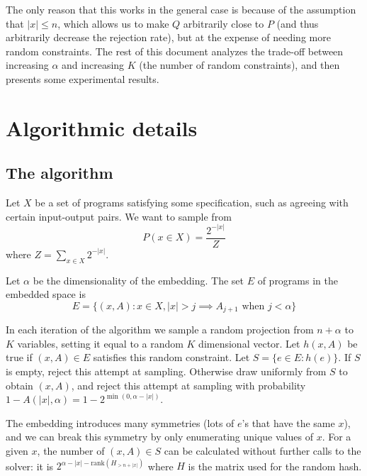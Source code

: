 \documentclass{article}
\begin{document}
The only reason that this works in the general case is because of the assumption that $|x|\leq n$,
which allows us to make $Q$ arbitrarily close to $P$ (and thus arbitrarily decrease the rejection rate),
but at the expense of needing more random constraints.
The rest of this document analyzes the trade-off between increasing $\alpha$ and increasing $K$ (the number of random constraints),
and then presents some experimental results.

\section{Algorithmic details}
\subsection{The algorithm}
Let $X$ be a set of programs satisfying some specification, such as agreeing with certain input-output pairs.
We want to sample from
\begin{equation}
  P(x\in X) = \frac{2^{-|x|}}{Z}
\end{equation}
where $Z = \sum_{x\in X}2^{-|x|}$.

Let $\alpha$ be the dimensionality of the embedding.
The set $E$ of programs in the embedded space is
\begin{equation}
  E = \{(x,A) : x\in X, |x|> j \implies A_{j+1}\text{ when } j<\alpha \}
\end{equation}

In each iteration of the algorithm we sample a random projection from $n+\alpha$ to $K$ variables, setting it equal to a random $K$ dimensional vector.
Let  $h(x,A)$ be true if $(x,A)\in E$ satisfies this random constraint.
Let $S = \{ e\in E : h(e)\}$.
If $S$ is empty, reject this attempt at sampling.
Otherwise draw uniformly from $S$ to obtain $(x,A)$,
and reject this attempt at sampling with probability $1 - A(|x|,\alpha) = 1 - 2^{\min(0,\alpha - |x|)}$.

The embedding introduces many symmetries (lots of $e$'s that have the same $x$),
and we can break this symmetry by only enumerating unique values of $x$.
For a given $x$, the number of $(x,A)\in S$ can be calculated without further calls to the solver:
it is $2^{\alpha - |x| - \text{rank}(H_{>n+|x|})}$ where $H$ is the matrix used for the random hash.
\end{document}
